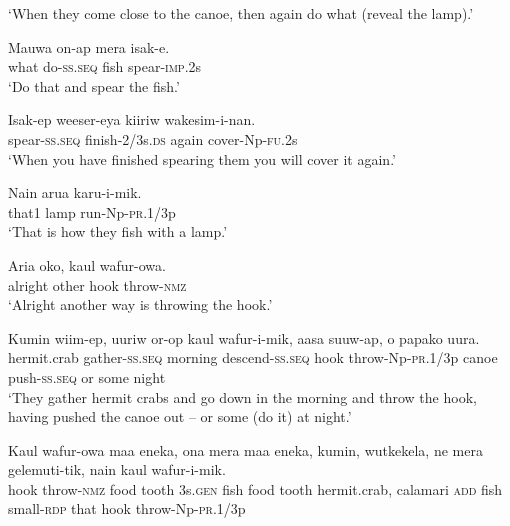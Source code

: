 \glt ‘When they come close to the canoe, then again do what (reveal the lamp).’ \\
\z


\ea\label{ex:a:x46}
\gll  Mauwa  on-ap  mera  isak-e. \\
what  do-\textsc{ss.seq}  fish  spear-\textsc{imp}.2s \\
\glt ‘Do that and spear the fish.’ \\
\z


\ea\label{ex:a:x47}
\gll  Isak-ep  weeser-eya  kiiriw  wakesim-i-nan. \\
spear-\textsc{ss.seq}  finish-2/3s.\textsc{ds}  again  cover-Np-\textsc{fu}.2s \\
\glt ‘When you have finished spearing them you will cover it again.’ \\
\z


\ea\label{ex:a:x48}
\gll  Nain  arua  karu-i-mik. \\
that1  lamp  run-Np-\textsc{pr}.1/3p \\
\glt ‘That is how they fish with a lamp.’ \\
\z


\ea\label{ex:a:x49}
\gll  Aria  oko,  kaul  wafur-owa. \\
alright  other  hook  throw-\textsc{nmz} \\
\glt ‘Alright another way is throwing the hook.’ \\
\z


\ea\label{ex:a:x50}
\gll  Kumin  wiim-ep,  uuriw  or-op  kaul                   wafur-i-mik,  aasa  suuw-ap,  o  papako  uura. \\
hermit.crab  gather-\textsc{ss.seq}  morning  descend-\textsc{ss.seq}  hook   throw-Np-\textsc{pr}.1/3p  canoe  push-\textsc{ss.seq}  or  some  night \\


\glt ‘They gather hermit crabs and go down in the morning and throw the hook, having pushed the canoe out – or some (do it) at night.’ \\
\z


\ea\label{ex:a:x51}
\gll  Kaul  wafur-owa  maa  eneka,  ona  mera  maa  eneka,   kumin,  wutkekela,  ne  mera  gelemuti-tik,        nain  kaul  wafur-i-mik. \\
hook  throw-\textsc{nmz}  food  tooth  3s.\textsc{gen}  fish  food  tooth      hermit.crab,  calamari  \textsc{add}  fish  small-\textsc{rdp}       that  hook  throw-Np-\textsc{pr}.1/3p \\




